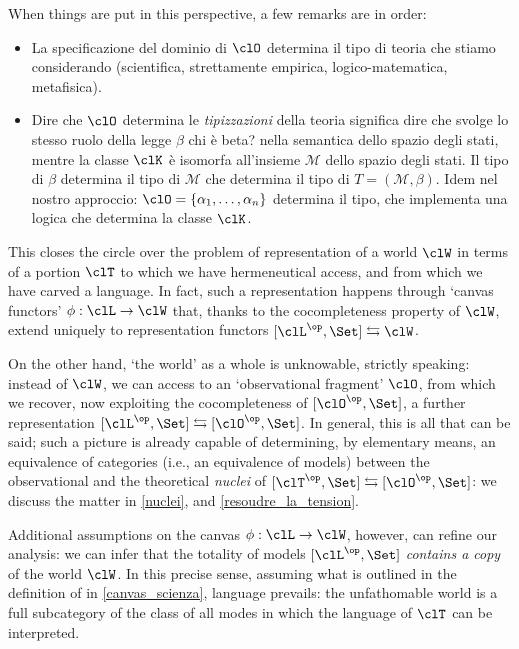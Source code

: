 When things are put in this perspective, a few remarks are in order: 
\color{blue!40}
\begin{itemize}
	\item La specificazione del dominio di $\clO$ determina il tipo di teoria che stiamo considerando (scientifica, strettamente empirica, logico-matematica, metafisica).
	\item Dire che $\clO$ determina le \emph{tipizzazioni} della teoria significa dire che svolge lo stesso ruolo della legge $\beta$ {\color{red} chi è beta?} nella semantica dello spazio degli stati, mentre la classe $\clK$ è isomorfa all'insieme $\mathcal{M}$ dello spazio degli stati. Il tipo di $\beta$ determina il tipo di $\mathcal{M}$ che determina il tipo di $T = (\mathcal{M}, \beta)$. Idem nel nostro approccio: $\clO 	= \{\alpha_1,\dots,\alpha_n\}$ determina il tipo, che implementa una logica che determina la classe $\clK$.
\end{itemize}
\color{black}
This closes the circle over the problem of representation of a world $\clW$ in terms of a portion $\clT$ to which we have hermeneutical access, and from which we have carved a language. In fact, such a representation happens through `canvas functors' $\phi : \clL \to \clW$ that, thanks to the cocompleteness property of $\clW$, extend uniquely to representation functors $[\clL^\op,\Set] \leftrightarrows \clW$. 

On the other hand, `the world' as a whole is unknowable, strictly speaking: instead of $\clW$, we can access to an `observational fragment' $\clO$, from which we recover, now exploiting the cocompleteness of $[\clO^\op,\Set]$, a further representation $[\clL^\op,\Set] \leftrightarrows [\clO^\op,\Set]$. In general, this is all that can be said; such a picture is already capable of determining, by elementary means, an equivalence of categories (i.e., an equivalence of models) between the observational and the theoretical \emph{nuclei} of $[\clT^\op,\Set] \leftrightarrows [\clO^\op,\Set]$: we discuss the matter in \autoref{nuclei}, and \autoref{resoudre_la_tension}.

Additional assumptions on the canvas $\phi : \clL\to \clW$, however, can refine our analysis: we can infer that the totality of models $[\clL^\op,\Set]$ \emph{contains a copy} of the world $\clW$. In this precise sense, assuming what is outlined in the definition of \science in \autoref{canvas_scienza}, language prevails: the unfathomable world is a full subcategory of the class of all modes in which the language of $\clT$ can be interpreted. 


